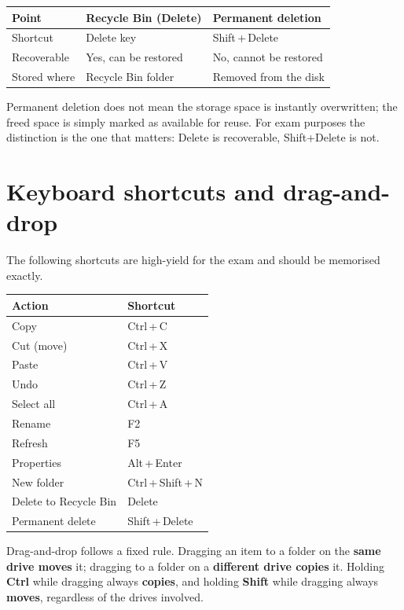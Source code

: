 \begin{center}
\begin{tabular}{p{}p{}p{}}
\toprule
\textbf{Point} & \textbf{Recycle Bin (Delete)} & \textbf{Permanent deletion} \\
\midrule
Shortcut & Delete key & Shift\,+\,Delete \\
Recoverable & Yes, can be restored & No, cannot be restored \\
Stored where & Recycle Bin folder & Removed from the disk \\
\bottomrule
\end{tabular}
\end{center}

Permanent deletion does not mean the storage space is instantly overwritten;
the freed space is simply marked as available for reuse. For exam purposes
the distinction is the one that matters: Delete is recoverable, Shift+Delete
is not.

\section{Keyboard shortcuts and drag-and-drop}
The following shortcuts are high-yield for the exam and should be memorised
exactly.

\begin{center}
\begin{tabular}{p{}p{}}
\toprule
\textbf{Action} & \textbf{Shortcut} \\
\midrule
Copy & Ctrl\,+\,C \\
Cut (move) & Ctrl\,+\,X \\
Paste & Ctrl\,+\,V \\
Undo & Ctrl\,+\,Z \\
Select all & Ctrl\,+\,A \\
Rename & F2 \\
Refresh & F5 \\
Properties & Alt\,+\,Enter \\
New folder & Ctrl\,+\,Shift\,+\,N \\
Delete to Recycle Bin & Delete \\
Permanent delete & Shift\,+\,Delete \\
\bottomrule
\end{tabular}
\end{center}

Drag-and-drop follows a fixed rule. Dragging an item to a folder on the
\textbf{same drive moves} it; dragging to a folder on a \textbf{different
drive copies} it. Holding \textbf{Ctrl} while dragging always \textbf{copies},
and holding \textbf{Shift} while dragging always \textbf{moves}, regardless
of the drives involved.

